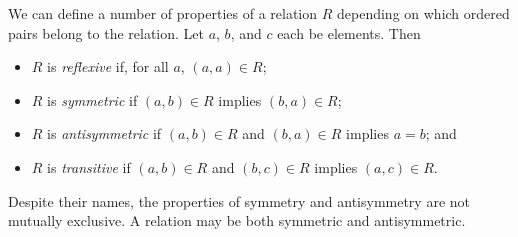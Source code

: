 We can define a number of properties of a relation $R$ depending on which ordered pairs belong to the relation. Let $a$, $b$, and $c$ each be elements. Then
\begin{colouredbox}
\begin{itemize}
\item $R$ is \emph{reflexive} if, for all $a$, $(a, a) \in R$;
\item $R$ is \emph{symmetric} if $(a, b) \in R$ implies $(b, a) \in R$;
\item $R$ is \emph{antisymmetric} if $(a, b) \in R$ and $(b, a) \in R$ implies $a = b$; and
\item $R$ is \emph{transitive} if $(a, b) \in R$ and $(b, c) \in R$ implies $(a, c) \in R$.
\end{itemize}
\end{colouredbox}

\noindent
Despite their names, the properties of symmetry and antisymmetry are not mutually exclusive. A relation may be both symmetric and antisymmetric.

